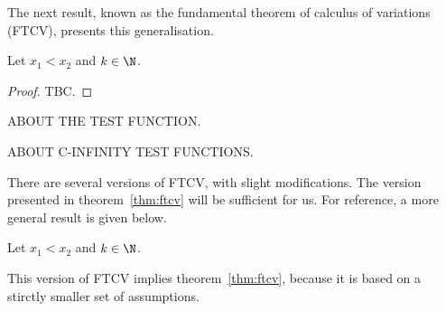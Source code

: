 The next result, known as the fundamental theorem of calculus of variations (FTCV), presents this generalisation.
\begin{nthm}
  \label{thm:ftcv}
  Let $x_1 < x_2$ and $k \in \N$.
\end{nthm}
\begin{proof}
  TBC.
\end{proof}

ABOUT THE TEST FUNCTION.

ABOUT C-INFINITY TEST FUNCTIONS.

There are several versions of FTCV, with slight modifications. The version presented in theorem~\ref{thm:ftcv} will be sufficient for us. For reference, a more general result is given below.
\begin{nthm}
  \label{thm:ftcv-supp}
  Let $x_1 < x_2$ and $k \in \N$.
\end{nthm}
This version of FTCV implies theorem~\ref{thm:ftcv}, because it is based on a stirctly smaller set of assumptions.
